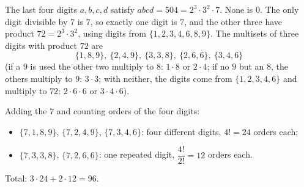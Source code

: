 The last four digits $a,b,c,d$ satisfy $abcd=504=2^3\cdot3^2\cdot7$. None is $0$. The only digit divisible by $7$ is $7$, so exactly one digit is $7$, and the other three have product $72=2^3\cdot3^2$, using digits from $\{1,2,3,4,6,8,9\}$. The multisets of three digits with product $72$ are
\[
\{1,8,9\},\ \{2,4,9\},\ \{3,3,8\},\ \{2,6,6\},\ \{3,4,6\}
\]
(if a $9$ is used the other two multiply to $8$: $1\cdot8$ or $2\cdot4$; if no $9$ but an $8$, the others multiply to $9$: $3\cdot3$; with neither, the digits come from $\{1,2,3,4,6\}$ and multiply to $72$: $2\cdot6\cdot6$ or $3\cdot4\cdot6$).

Adding the $7$ and counting orders of the four digits:
\begin{itemize}
\item $\{7,1,8,9\}$, $\{7,2,4,9\}$, $\{7,3,4,6\}$: four different digits, $4!=24$ orders each;
\item $\{7,3,3,8\}$, $\{7,2,6,6\}$: one repeated digit, $\dfrac{4!}{2!}=12$ orders each.
\end{itemize}
Total: $3\cdot24+2\cdot12=\boxed{96}$.
